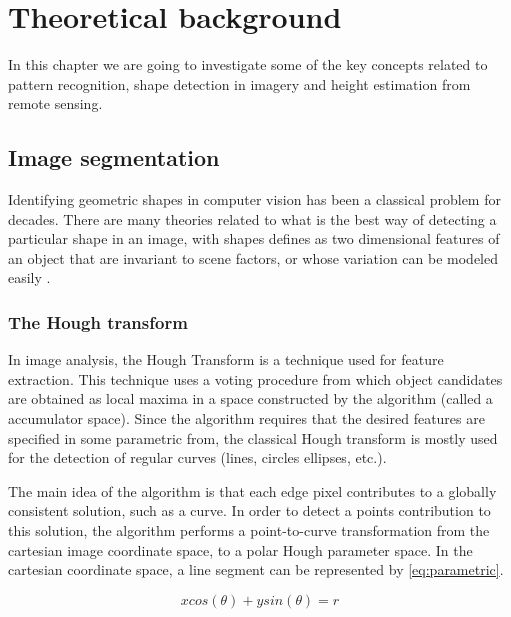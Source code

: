 \chapter{Theoretical background}
In this chapter we are going to investigate some of the key concepts related to pattern recognition, shape detection in imagery and height estimation from remote sensing. 

\section{Image segmentation}
Identifying geometric shapes in computer vision has been a classical problem for decades. There are many theories related to what is the best way of detecting a particular shape in an image, with shapes defines as two dimensional features of an object that are invariant to scene factors, or whose variation can be modeled easily \citep{Moon2002}.

\subsection{The Hough transform}
In image analysis, the Hough Transform is a technique used for feature extraction. This technique uses a voting procedure from which object candidates are obtained as local maxima in a space constructed by the algorithm (called a accumulator space). Since the algorithm requires that the desired features are specified in some parametric from, the classical Hough transform is mostly used for the detection of regular curves (lines, circles ellipses, etc.).

The main idea of the algorithm is that each edge pixel contributes to a globally consistent solution, such as a curve. In order to detect a points contribution to this solution, the algorithm performs a point-to-curve transformation from the cartesian image coordinate space, to a polar Hough parameter space. In the cartesian coordinate space, a line segment can be represented by \autoref{eq:parametric}.

\begin{equation}
	xcos(\theta) + ysin(\theta) = r
	\label{eq:parametric}
\end{equation}

